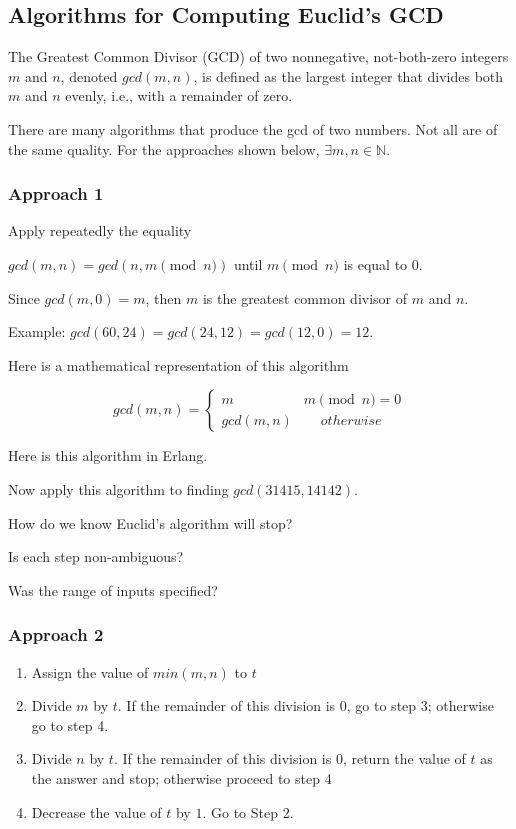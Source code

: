 \documentclass[12pt]{amsart}
\begin{document}
  \subsection{ Algorithms for Computing Euclid's GCD}

  The Greatest Common Divisor (GCD) of two nonnegative, not-both-zero
  integers $m$ and $n$, denoted $gcd(m, n)$, is defined as the largest
  integer that divides both $m$ and $n$ evenly, i.e., with a remainder
  of zero.
  
  There are many algorithms that produce the gcd of two numbers. Not all are of the same quality. For the approaches shown below, $\exists m,n \in\mathbb{N}$.

\subsubsection{Approach 1}

   Apply repeatedly the equality
 
   $gcd(m, n) = gcd(n, m \pmod n)$ until $m \pmod n$ is equal to $0$.

   Since $gcd(m, 0) = m$, then $m$ is the greatest common divisor of
   $m$ and $n$.

   Example: $gcd(60, 24) = gcd(24, 12) = gcd(12, 0) = 12$.
   
Here is a mathematical representation of this algorithm
   
   \[ gcd(m,n) = \begin{cases}
    m\qquad\quad\quad\quad m\pmod n = 0\\
    gcd(m,n)\qquad otherwise 
\end{cases} 
\]
   
Here is this algorithm in Erlang.
\lstset{language=Erlang}


   Now apply this algorithm to finding $gcd(31415, 14142)$.

   How do we know Euclid's algorithm will stop?

   Is each step non-ambiguous?

   Was the range of inputs specified?
   


\subsubsection{Approach 2}

\begin{enumerate}
   \item Assign the value of $min(m, n)$ to $t$
   \item Divide $m$ by $t$.  If the remainder of this division is $0$, go
      to step 3; otherwise go to step 4.
   \item Divide $n$ by $t$.  If the remainder of this division is $0$,
      return the value of $t$ as the answer and stop; otherwise
      proceed to step 4
   \item Decrease the value of $t$ by $1$. Go to Step 2.
\end{enumerate}
   
\end{document}
